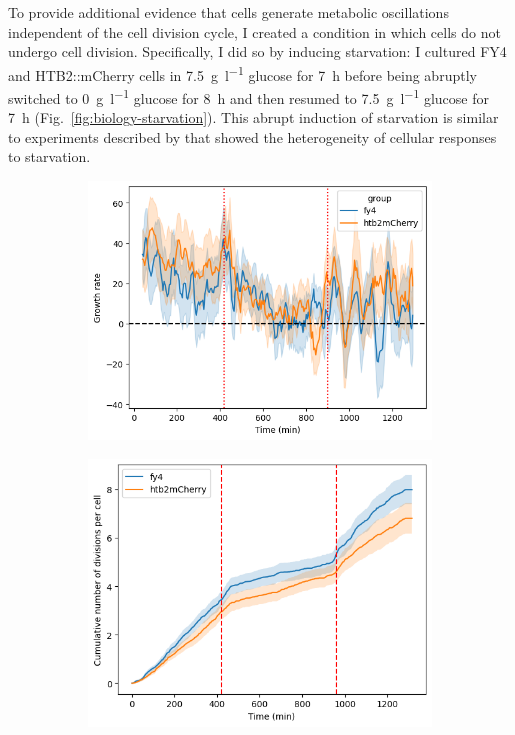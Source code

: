 To provide additional evidence that cells generate metabolic oscillations independent of the cell division cycle, I created a condition in which cells do not undergo cell division.
Specifically, I did so by inducing starvation: I cultured FY4 and HTB2::mCherry cells in \SI{7.5}{\gram~\litre^{-1}} glucose for \SI{7}{\hour} before being abruptly switched to \SI{0}{\gram~\litre^{-1}} glucose for \SI{8}{\hour} and then resumed to \SI{7.5}{\gram~\litre^{-1}} glucose for \SI{7}{\hour} (Fig.\ \ref{fig:biology-starvation}).
This abrupt induction of starvation is similar to experiments described by \textcite{bagameryPutativeBetHedgingStrategy2020} that showed the heterogeneity of cellular responses to starvation.


\begin{figure}
  \centering
  \begin{subfigure}[htpb]{0.45\textwidth}
   \centering
   \includegraphics[width=\textwidth]{allstrains_19972_gr}
   \caption{
   }
   \label{fig:biology-starvation-gr}
  \end{subfigure}%
  \begin{subfigure}[htpb]{0.45\textwidth}
   \centering
   \includegraphics[width=\textwidth]{allstrains_19972_cumul}
   \caption{
   }
   \label{fig:biology-starvation-cumul}
  \end{subfigure}


\end{figure}
